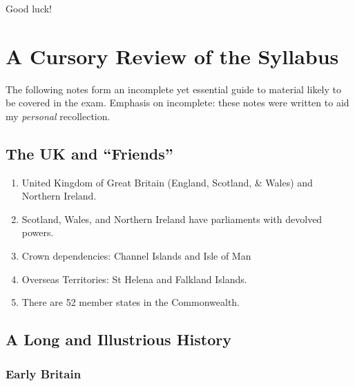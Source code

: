 \documentclass[10pt,reqno]{amsart}
\begin{document}
\vspace{5mm}

Good luck!






\newpage

\section{A Cursory Review of the Syllabus}



The following notes form an incomplete yet essential guide to material likely to be covered in the exam. Emphasis on incomplete: these notes were written to aid my \textit{personal} recollection.




\subsection{The UK and ``Friends''}

\begin{enumerate}[i]
\item United Kingdom of Great Britain (England, Scotland, \& Wales) and Northern Ireland. 
\item Scotland, Wales, and Northern Ireland have parliaments with devolved powers. 
\item Crown dependencies: Channel Islands and Isle of Man
\item Overseas Territories: St Helena and Falkland Islands.
\item There are 52 member states in the Commonwealth.  
\end{enumerate}



\subsection{A Long and Illustrious History}
 


\subsubsection{Early Britain}
\end{document}

